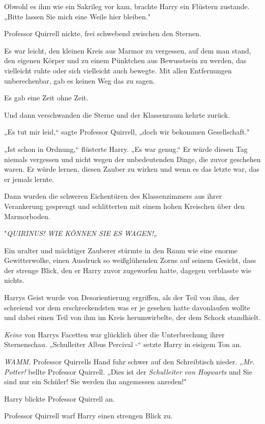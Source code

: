 {Obwohl es ihm wie ein Sakrileg vor kam, brachte Harry ein Flüstern zustande. „Bitte lassen Sie mich eine Weile hier bleiben."

Professor Quirrell nickte, frei schwebend zwischen den Sternen.

Es war leicht, den kleinen Kreis aus Marmor zu vergessen, auf dem man stand, den eigenen Körper und zu einem Pünktchen aus Bewusstsein zu werden, das vielleicht ruhte oder sich vielleicht auch bewegte. Mit allen Entfernungen unberechenbar, gab es keinen Weg das zu sagen.

Es gab eine Zeit ohne Zeit.

Und dann verschwanden die Sterne und der Klassenraum kehrte zurück.

„Es tut mir leid,“ sagte Professor Quirrell, „doch wir bekommen Gesellschaft."

„Ist schon in Ordnung,“ flüsterte Harry. „Es war genug.“ Er würde diesen Tag niemals vergessen und nicht wegen der unbedeutenden Dinge, die zuvor geschehen waren. Er würde lernen, diesen Zauber zu wirken und wenn es das letzte war, das er jemals lernte.

Dann wurden die schweren Eichentüren des Klassenzimmers aus ihrer Verankerung gesprengt und schlitterten mit einem hohen Kreischen über den Marmorboden.

"\emph{QUIRINUS! WIE KÖNNEN SIE ES WAGEN!}„

Ein uralter und mächtiger Zauberer stürmte in den Raum wie eine enorme Gewitterwolke, einen Ausdruck so weißglühenden Zorns auf seinem Gesicht, dass der strenge Blick, den er Harry zuvor zugeworfen hatte, dagegen verblasste wie nichts.

Harrys Geist wurde von Desorientierung ergriffen, als der Teil von ihm, der schreiend vor dem erschreckendsten was er je gesehen hatte davonlaufen wollte und dabei einen Teil von ihm im Kreis herumwirbelte, der dem Schock standhielt.

\emph{Keine} von Harrys Facetten war glücklich über die Unterbrechung ihrer Sternenschau. „Schulleiter Albus Percival -“ setzte Harry in eisigem Ton an.

\emph{WAMM.} Professor Quirrells Hand fuhr schwer auf den Schreibtisch nieder. „\emph{Mr. Potter!} bellte Professor Quirrell. „Dies ist der \emph{Schulleiter von Hogwarts} und Sie sind nur ein Schüler! Sie werden ihn angemessen anreden!"

Harry blickte Professor Quirrell an.

Professor Quirrell warf Harry einen strengen Blick zu.

}
